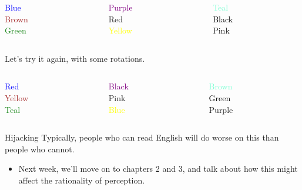 \documentclass[
  17pt,
  letterpaper,
  ignorenonframetext,
  aspectratio=169,
  handout,
  xcolor={dvipsnames}]{beamer}
\providecommand{\tightlist}{%
  \setlength{\itemsep}{0pt}\setlength{\parskip}{0pt}}\usepackage{longtable,booktabs,array}
\begin{document}
\begin{frame}
\begin{columns}[T]
\begin{column}{0.25\textwidth}
\Large{ \textcolor{Blue}{Blue} \\ \textcolor{Brown}{Brown}  \\ \textcolor{ForestGreen}{Green} }
\end{column}

\begin{column}{0.25\textwidth}
\Large{  \textcolor{Purple}{Purple}    \\  \textcolor{BrickRed}{Red}    \\     \textcolor{Yellow}{Yellow} }
\end{column}

\begin{column}{0.25\textwidth}
\Large{  \textcolor{Aquamarine}{Teal} \\  \textcolor{Black}{Black} \\  \textcolor{Rhodamine}{Pink} }
\end{column}
\end{columns}
\end{frame}

\begin{frame}
Let's try it again, with some rotations.
\end{frame}

\begin{frame}
\begin{columns}[T]
\begin{column}{0.25\textwidth}
\Large{ \textcolor{Blue}{Red} \\ \textcolor{Brown}{Yellow}  \\ \textcolor{ForestGreen}{Teal} }
\end{column}

\begin{column}{0.25\textwidth}
\Large{  \textcolor{Purple}{Black}    \\  \textcolor{BrickRed}{Pink}    \\     \textcolor{Yellow}{Blue} }
\end{column}

\begin{column}{0.25\textwidth}
\Large{  \textcolor{Aquamarine}{Brown} \\  \textcolor{Black}{Green} \\  \textcolor{Rhodamine}{Purple} }
\end{column}
\end{columns}
\end{frame}

\begin{frame}{Hijacking}
\protect\hypertarget{hijacking}{}
Typically, people who can read English will do worse on this than people
who cannot.

\begin{itemize}[<+->]
\tightlist
\item
  Next week, we'll move on to chapters 2 and 3, and talk about how this
  might affect the rationality of perception.
\end{itemize}
\end{frame}
\end{document}
